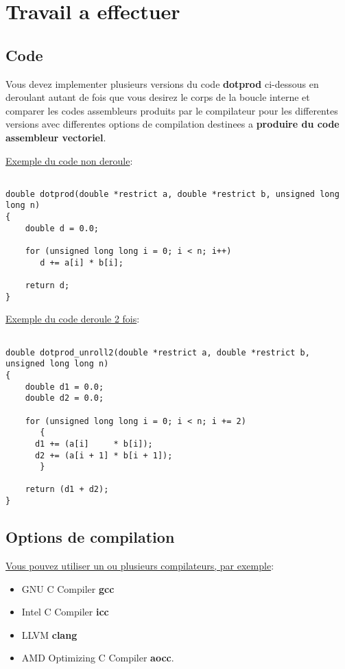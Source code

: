 \documentclass[11pt]{article}
\begin{document}
\section{Travail a effectuer}
\label{sec:org2b20f88}
\subsection{Code}
\label{sec:orgedcb4b7}

Vous devez implementer plusieurs versions du code \textbf{dotprod} ci-dessous en deroulant autant de fois 
que vous desirez le corps de la boucle interne et comparer les codes assembleurs produits par le compilateur 
pour les differentes versions avec differentes options de compilation destinees a \textbf{produire du code assembleur vectoriel}.

\uline{Exemple du code non deroule}:

\begin{verbatim}

double dotprod(double *restrict a, double *restrict b, unsigned long long n)
{
    double d = 0.0;

    for (unsigned long long i = 0; i < n; i++)
       d += a[i] * b[i];

    return d;
}

\end{verbatim}

\uline{Exemple du code deroule 2 fois}:

\begin{verbatim}

double dotprod_unroll2(double *restrict a, double *restrict b, unsigned long long n)
{
    double d1 = 0.0;
    double d2 = 0.0;

    for (unsigned long long i = 0; i < n; i += 2)
       {
	  d1 += (a[i]     * b[i]);
	  d2 += (a[i + 1] * b[i + 1]);
       }

    return (d1 + d2);
}

\end{verbatim}

\subsection{Options de compilation}
\label{sec:org453610e}

\uline{Vous pouvez utiliser un ou plusieurs compilateurs, par exemple}: 

\begin{itemize}
\item GNU C Compiler \textbf{gcc}
\item Intel C Compiler \textbf{icc}
\item LLVM \textbf{clang}
\item AMD Optimizing C Compiler \textbf{aocc}.
\end{itemize}
\end{document}
